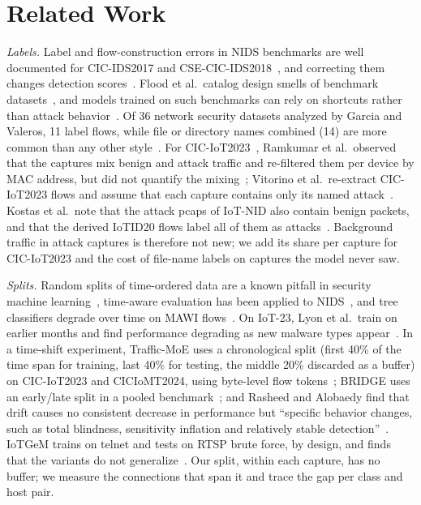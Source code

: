\section{Related Work}\label{sec:related}

\emph{Labels.} Label and flow-construction errors in NIDS benchmarks are well documented for CIC-IDS2017 and CSE-CIC-IDS2018~\cite{engelen2021troubleshooting,liu2022error}, and correcting them changes detection scores~\cite{lanvin2023errors}. Flood et al.\ catalog design smells of benchmark datasets~\cite{flood2024smells}, and models trained on such benchmarks can rely on shortcuts rather than attack behavior~\cite{jacobs2022emperor}. Of 36 network security datasets analyzed by Garcia and Valeros, 11 label flows, while file or directory names combined (14) are more common than any other style~\cite{garcia2023labeling}. For CIC-IoT2023~\cite{neto2023ciciot2023}, Ramkumar et al.\ observed that the captures mix benign and attack traffic and re-filtered them per device by MAC address, but did not quantify the mixing~\cite{ramkumar2024diagnosing}; Vitorino et al.\ re-extract CIC-IoT2023 flows and assume that each capture contains only its named attack~\cite{vitorino2025revisiting}. Kostas et al.\ note that the attack pcaps of IoT-NID also contain benign packets, and that the derived IoTID20 flows label all of them as attacks~\cite[App.~A.3]{kostas2024iotgem}. Background traffic in attack captures is therefore not new; we add its share per capture for CIC-IoT2023 and the cost of file-name labels on captures the model never saw.

\emph{Splits.} Random splits of time-ordered data are a known pitfall in security machine learning~\cite{arp2022dos,pendlebury2019tesseract,apruzzese2023sok}, time-aware evaluation has been applied to NIDS~\cite{andresini2021insomnia}, and tree classifiers degrade over time on MAWI flows~\cite{schraven2026mawiflow}. On IoT-23, Lyon et al.\ train on earlier months and find performance degrading as new malware types appear~\cite{lyon2026iot23drift}. In a time-shift experiment, Traffic-MoE uses a chronological split (first 40\% of the time span for training, last 40\% for testing, the middle 20\% discarded as a buffer) on CIC-IoT2023 and CICIoMT2024, using byte-level flow tokens~\cite{zhou2026trafficmoe}; BRIDGE uses an early/late split in a pooled benchmark~\cite{bridge2026tchnet}; and Rasheed and Alobaedy find that drift causes no consistent decrease in performance but ``specific behavior changes, such as total blindness, sensitivity inflation and relatively stable detection''~\cite{rasheed2026drift}. IoTGeM trains on telnet and tests on RTSP brute force, by design, and finds that the variants do not generalize~\cite{kostas2024iotgem}. Our split, within each capture, has no buffer; we measure the connections that span it and trace the gap per class and host pair.

